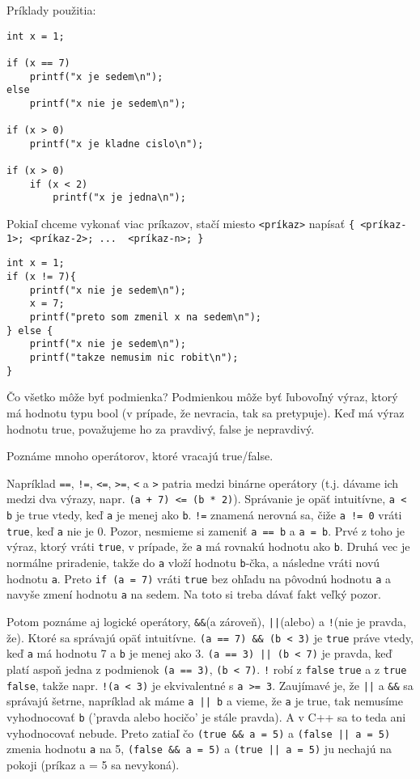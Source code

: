 Príklady použitia:
\begin{lstlisting}
int x = 1;

if (x == 7) 
    printf("x je sedem\n");
else
    printf("x nie je sedem\n");

if (x > 0)
    printf("x je kladne cislo\n");

if (x > 0)
    if (x < 2)
        printf("x je jedna\n");
\end{lstlisting}

Pokiaľ chceme vykonať viac príkazov, stačí miesto \verb!<príkaz>! napísať \verb!{ <príkaz-1>; <príkaz-2>; ...  <príkaz-n>; }!
\begin{lstlisting}
int x = 1;
if (x != 7){
    printf("x nie je sedem\n");
    x = 7;
    printf("preto som zmenil x na sedem\n");
} else {
    printf("x nie je sedem\n");
    printf("takze nemusim nic robit\n");
}
\end{lstlisting}

\medskip

Čo všetko môže byť podmienka?  Podmienkou môže byť ľubovoľný výraz, ktorý má
hodnotu typu bool (v prípade, že nevracia, tak sa pretypuje).  Keď má výraz
hodnotu true, považujeme ho za pravdivý, false je nepravdivý.

Poznáme mnoho operátorov, ktoré vracajú true/false. 

Napríklad \verb'==', \verb'!=', \verb'<=', \verb'>=', \verb'<' a \verb'>' patria medzi binárne
operátory (t.j. dávame ich medzi dva výrazy, napr. \verb!(a + 7) <= (b * 2)!).
Správanie je opäť intuitívne, \verb'a < b' je true vtedy, keď \verb!a! je menej ako
\verb!b!.  \verb'!=' znamená nerovná sa, čiže \verb'a != 0' vráti \verb!true!, keď
\verb!a! nie je 0. Pozor, nesmieme si zameniť \verb'a == b' a \verb'a = b'.  Prvé z
toho je výraz, ktorý vráti \verb!true!, v prípade, že \verb!a! má rovnakú hodnotu
ako \verb!b!. Druhá vec je normálne priradenie, takže do \verb!a! vloží hodnotu \verb!b!-čka,
a následne vráti novú hodnotu \verb!a!. Preto \verb!if (a = 7)! vráti \verb!true!
bez ohľadu na pôvodnú hodnotu \verb!a! a navyše zmení hodnotu \verb!a! na sedem.  Na toto
si treba dávať fakt veľký pozor. 

Potom poznáme aj logické operátory, \verb!&&!(a zároveň), \verb!||!(alebo) a
\verb'!'(nie je pravda, že). Ktoré sa správajú opäť intuitívne.  
\verb!(a == 7) && (b < 3)! je \verb!true! práve vtedy, keď \verb!a! má hodnotu 7 a
\verb!b! je menej ako 3. \verb!(a == 3) || (b < 7)! je pravda, keď platí aspoň jedna
z podmienok \verb!(a == 3)!, \verb!(b < 7)!. \verb'!' robí z 
\verb!false! \verb!true! a z \verb!true! \verb!false!, takže napr. \verb'!(a < 3)' je
ekvivalentné s \verb'a >= 3'.  Zaujímavé je, že \verb!||! a \verb!&&! sa
správajú šetrne, napríklad ak máme \verb!a || b! a vieme, že \verb!a! je true, tak
nemusíme vyhodnocovať \verb!b! ('pravda alebo hocičo' je stále pravda). A v C++ sa
to teda ani vyhodnocovať nebude.  Preto zatiaľ čo \verb!(true && a = 5)! a
\verb!(false || a = 5)!  zmenia hodnotu \verb!a! na 5, \verb!(false && a = 5)! a
\verb!(true || a = 5)! ju nechajú na pokoji (príkaz a = 5 sa nevykoná).

